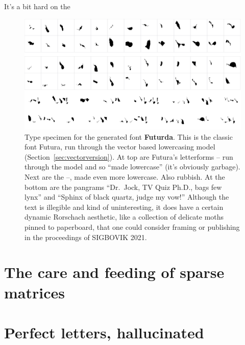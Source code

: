 \documentclass[twocolumn]{amsart}
\begin{document}
It's a bit hard on the



\begin{figure}[tp]
\includegraphics[width=0.9 \linewidth]{futurda}
\caption{ Type specimen for the generated font {\bf Futurda}. This is the
  classic font Futura, run through the vector based lowercasing model
  (Section~\ref{sec:vectorversion}). At top are Futura's letterforms
  -- run through the model and so ``made
  lowercase'' (it's obviously garbage). Next are the --,
  made even more lowercase. Also rubbish.
  At the bottom are the pangrams ``Dr.~Jock, TV Quiz Ph.D., bags few lynx''
  and ``Sphinx of black quartz, judge my vow!'' Although the text is
  illegible and kind of uninteresting, it does have a certain dynamic
  Rorschach aesthetic, like a collection of delicate moths pinned
  to paperboard, that one could consider framing or publishing in
  the proceedings of SIGBOVIK 2021.
} \label{fig:futurda}
\end{figure}





\section{The care and feeding of sparse matrices} \label{sec:neural}

\label{sec:fiddly}



%

\section{Perfect letters, hallucinated}
\label{sec:hallucination}






\nocite{murphy2019blind}
\nocite{murphy2019eloworld}

{}

\end{document}
